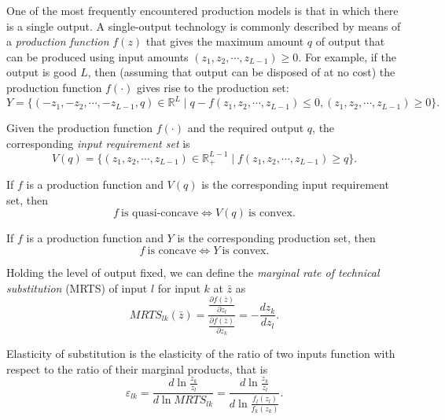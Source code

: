 \documentclass[12pt,fleqn]{book} %
\begin{document}
\begin{definition}
	One of the most frequently encountered production models is that in which there	is a single output. A single-output technology is commonly described by means of a \emph{production function} $f(z)$ that gives the maximum amount $q$ of output that can be
	produced using input amounts $(z_1,z_2,\cdots,z_{L-1})\ge0$. For example, if the output is good $L$, then (assuming that output can be disposed of at no cost) the production function
	$f(\cdot)$ gives rise to the production set:
	\[
	Y = \{(-z_1,-z_2,\cdots,-z_{L-1},q)\in\mathbb{R}^L\;|\;q-f(z_1,z_2,\cdots,z_{L-1})\le0,(z_1,z_2,\cdots,z_{L-1})\ge0\}.
	\]
	
\end{definition}

\begin{definition}
Given the production function $f(\cdot)$ and the required output $q$, the corresponding \emph{input requirement set} is
	\[
	V(q) = \{(z_1,z_2,\cdots,z_{L-1})\in\mathbb{R}_+^{L-1}\;|\;f(z_1,z_2,\cdots,z_{L-1})\ge q\}.
	\]
	
\end{definition}	
	
\begin{proposition}
If $f$ is a production function and $V(q)$ is the corresponding input requirement set, then
\[
f\ \text{is quasi-concave} \iff V(q)\ \text{is convex}.
\]
\end{proposition}	

\begin{proposition}
	If $f$ is a production function and $Y$ is the corresponding production set, then
	\[
	f\ \text{is concave} \iff Y\ \text{is convex}.
	\]	
\end{proposition}

\begin{definition}
Holding the level of output fixed, we can define the \emph{marginal rate of technical substitution} (MRTS) of input $l$ for input $k$ at $\bar{z}$ as
   \[
   MRTS_{lk}(\bar{z})=\frac{\frac{\partial f(\bar{z})}{\partial z_l}}{\frac{\partial f(\bar{z})}{\partial z_k}}=-\frac{dz_k}{dz_l}.
   \]
	
\end{definition}	
	
\begin{definition}
Elasticity of substitution is the elasticity of the ratio of two inputs function with respect to the ratio of their marginal products, that is
	\[
    \varepsilon_{lk}=\frac{d\ln\frac{z_k}{z_l}}{d\ln MRTS_{lk}}=\frac{d\ln\frac{z_k}{z_l}}{d\ln\frac{f_l(z_l)}{f_k(z_k )}}.
	\]
	
\end{definition}	
\end{document}
